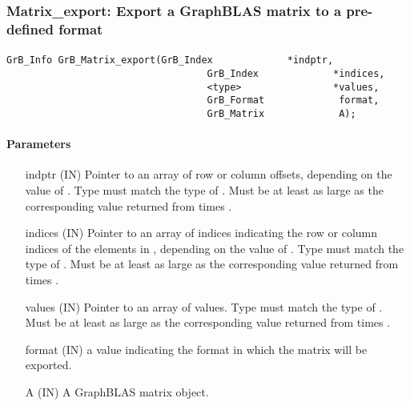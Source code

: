 \subsubsection{{\sf Matrix\_export}: Export a GraphBLAS matrix to a pre-defined format }
\label{Sec:Matrix_export}

\paragraph{\syntax}

\begin{Verbatim}[samepage=true]    
        GrB_Info GrB_Matrix_export(GrB_Index             *indptr,
                                   GrB_Index             *indices,
                                   <type>                *values,
                                   GrB_Format             format,
                                   GrB_Matrix             A);
\end{Verbatim}

\paragraph{Parameters}

\begin{itemize}[leftmargin=1.1in]
    \item[{\sf indptr}] ({\sf IN}) Pointer to an array of row or column offsets, depending on the value of .  Type must match the type of .  Must be at least as large as the corresponding value returned from  times .
    \item[{\sf indices}] ({\sf IN}) Pointer to an array of indices indicating the row or column indices of the elements in , depending on the value of .  Type must match the type of .  Must be at least as large as the corresponding value returned from  times .
    \item[{\sf values}] ({\sf IN}) Pointer to an array of values.  Type must match the type of .  Must be at least as large as the corresponding value returned from  times .
    \item[{\sf format}] ({\sf IN}) a value indicating the format in which the matrix will be exported.
    \item[{\sf A}]      ({\sf IN}) A GraphBLAS matrix object.
\end{itemize}

